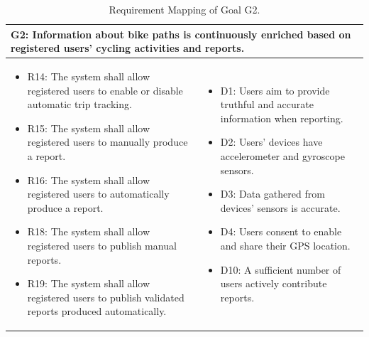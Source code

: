 \begin{table}[H]
    \renewcommand{\arraystretch}{1.3}
    \begin{tabularx}{\textwidth}{|X|X|}
    \hline
    \multicolumn{2}{|p{0.95\textwidth}|}{G2: Information about bike paths is continuously enriched based on registered users’ cycling activities and reports.} \\ \hline
    \begin{itemize}[topsep=0pt, partopsep=0pt, leftmargin=*]
        \item R14: The system shall allow registered users to enable or disable automatic trip tracking.
        \item R15: The system shall allow registered users to manually produce a report.
        \item R16: The system shall allow registered users to automatically produce a report.
        \item R18: The system shall allow registered users to publish manual reports.
        \item R19: The system shall allow registered users to publish validated reports produced automatically.
    \end{itemize} & \begin{itemize}[topsep=0pt, partopsep=0pt, leftmargin=*]
        \item D1: Users aim to provide truthful and accurate information when reporting.
        \item D2: Users’ devices have accelerometer and gyroscope sensors.
        \item D3: Data gathered from devices’ sensors is accurate.
        \item D4: Users consent to enable and share their GPS location.
        \item D10: A sufficient number of users actively contribute reports.
    \end{itemize} \\ \hline
    \end{tabularx}
    \caption{Requirement Mapping of Goal G2.}
    \label{tab:rm_g2}
\end{table}

